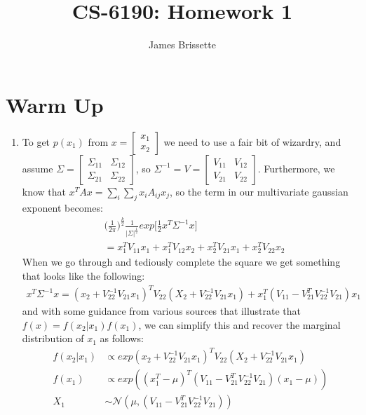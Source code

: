 \documentclass[11pt,a4paper]{article}
\author{James Brissette}
\title{CS-6190: Homework 1}
\begin{document}
	\maketitle
	
	\section{Warm Up}
		\begin{enumerate}
			\item To get $p(x_1)$ from $x = \begin{bmatrix} x_1 \\ x_2 \end{bmatrix}$ we need to use a fair bit of wizardry, and assume $\Sigma = \begin{bmatrix} \Sigma_{11} & \Sigma_{12} \\ \Sigma_{21} & \Sigma_{22}\end{bmatrix}$, so $\Sigma^{-1} = V = \begin{bmatrix} V_{11} & V_{12} \\ V_{21} & V_{22}\end{bmatrix}$. Furthermore, we know that $x^TAx = \sum_i \sum_j x_iA_{ij}x_j$, so the term in our multivariate gaussian exponent becomes: 
			\begin{align*}
				&\Big(\frac{1}{2\pi}\Big)^{\frac{k}{2}} \frac{1}{| \Sigma |^\frac{1}{2}} exp \big[ \frac{1}{2}x^T\Sigma^{-1}x \big] \\
				&= x_1^T V_{11} x_1 + x_1^T V_{12} x_2 + x_2^T V_{21} x_1 + x_2^T V_{22} x_2
			\end{align*}
			When we go through and tediously complete the square we get something that looks like the following:
			\begin{align*}
			x^T \Sigma^{-1}x = (x_2 + V_{22}^{-1}V_{21}x_1)^T V_{22}(X_2 + V_{22}^{-1}V_{21}x_1) +x_1^T(V_{11}-V_{21}^T V_{22}^{-1}V_{21})x_1
			\end{align*}
			and with some guidance from various sources that illustrate that $f(x) = f(x_{2}|x_{1})f(x_{1})$, we can simplify this and recover the marginal distribution of $x_1$ as follows:
			\begin{align*}
				f(x_{2} | x_{1}) &\propto exp(x_2 + V_{22}^{-1}V_{21}x_1)^T V_{22}(X_2 + V_{22}^{-1}V_{21}x_1) \\
				f(x_1) &\propto exp((x_1^T - \mu)^T(V_{11}-V_{21}^T V_{22}^{-1}V_{21})(x_1-\mu)) \\
			X_1 &\mathtt{\sim} \mathcal{N}(\mu, (V_{11}-V_{21}^T V_{22}^{-1}V_{21}))
			\end{align*}

\end{enumerate}
\end{document}
